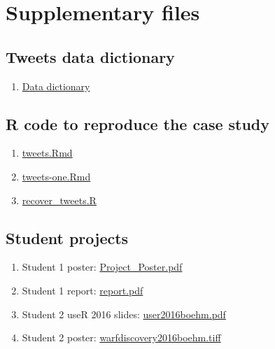\documentclass[
]{article}
\providecommand{\tightlist}{%
  \setlength{\itemsep}{0pt}\setlength{\parskip}{0pt}}
\begin{document}
\newpage

\hypertarget{supplementary-files}{%
\section{Supplementary files}\label{supplementary-files}}

\hypertarget{tweets-data-dictionary}{%
\subsection{Tweets data dictionary}\label{tweets-data-dictionary}}

\begin{enumerate}
\def\labelenumi{\arabic{enumi}.}
\tightlist
\item
  \href{https://github.com/fboehm/jse-2019/blob/master/data/tweets-data-dictionary.csv}{Data dictionary}
\end{enumerate}

\hypertarget{r-code-to-reproduce-the-case-study}{%
\subsection{R code to reproduce the case study}\label{r-code-to-reproduce-the-case-study}}

\begin{enumerate}
\def\labelenumi{\arabic{enumi}.}
\tightlist
\item
  \href{https://raw.githubusercontent.com/fboehm/jse-2019/master/Rmd/tweets.Rmd}{tweets.Rmd}
\item
  \href{https://raw.githubusercontent.com/fboehm/jse-2019/master/Rmd/tweets-one.Rmd}{tweets-one.Rmd}
\item
  \href{https://raw.githubusercontent.com/fboehm/jse-2019/master/Rmd/recover_tweets.R}{recover\_tweets.R}
\end{enumerate}

\hypertarget{student-projects}{%
\subsection{Student projects}\label{student-projects}}

\begin{enumerate}
\def\labelenumi{\arabic{enumi}.}
\tightlist
\item
  Student 1 poster: \href{https://github.com/fboehm/jse-2019/blob/master/supplementary/Project_Poster.pdf}{Project\_Poster.pdf}
\item
  Student 1 report: \href{https://github.com/fboehm/jse-2019/blob/master/supplementary/report.pdf}{report.pdf}
\item
  Student 2 useR 2016 slides: \href{https://github.com/fboehm/jse-2019/blob/master/supplementary/user2016boehm.pdf}{user2016boehm.pdf}
\item
  Student 2 poster: \href{https://github.com/fboehm/jse-2019/blob/master/supplementary/warfdiscovery2016boehm.tiff}{warfdiscovery2016boehm.tiff}
\end{enumerate}
\end{document}

